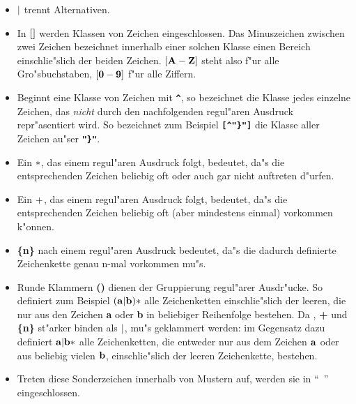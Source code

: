 \begin{itemize}
  
\item ${\bf |}$ trennt Alternativen.
  
\item In  ${\bf []}$ werden Klassen von Zeichen eingeschlossen. Das
Minuszeichen zwischen zwei Zeichen bezeichnet innerhalb einer solchen
Klasse einen Bereich einschlie"slich der beiden Zeichen. ${\bf [A-Z]}$
steht also f"ur alle Gro"sbuchstaben, ${\bf [0-9]}$ f"ur alle Ziffern.
  
\item Beginnt eine Klasse von Zeichen mit {\bf \verb&^&}, so
bezeichnet die Klasse jedes einzelne Zeichen, das {\it nicht} durch
den nachfolgenden regul"aren Ausdruck repr"asentiert wird. So
bezeichnet zum Beispiel {\bf \verb&[^"}"]&} die Klasse aller Zeichen
au"ser {\bf \verb&"}"&}.
  
\item Ein ${\bf *}$, das einem regul"aren Ausdruck folgt, bedeutet,
da"s die entsprechenden Zeichen beliebig oft oder auch gar nicht
auftreten d"urfen.
  
\item Ein ${\bf +}$, das einem regul"aren Ausdruck folgt, bedeutet,
da"s die entsprechenden Zeichen beliebig oft (aber mindestens einmal)
vorkommen k"onnen.
  
\item {\bf \{n\}} nach einem regul"aren Ausdruck bedeutet, da"s die
dadurch definierte Zeichenkette genau n-mal vorkommen mu"s.
  
\item Runde Klammern {\bf
()} dienen der Gruppierung regul"arer
Ausdr"ucke. So definiert zum Beispiel ${\bf
(a|b)*}$ alle Zeichenketten einschlie"slich der leeren, die nur aus
den Zeichen {\bf a} oder {\bf b} in beliebiger Reihenfolge bestehen.
Da {\bf *}, {\bf +} und {\bf \{n\}} st"arker
binden als ${\bf |}$, mu"s geklammert
werden: im Gegensatz dazu definiert ${\bf a|b*}$ alle Zeichenketten,
die entweder nur aus dem Zeichen ${\bf a}$ oder aus beliebig vielen
${\bf b}$, einschlie"slich der leeren Zeichenkette, bestehen.
  
\item Treten diese Sonderzeichen innerhalb von Mustern auf, werden sie
 in ``~'' eingeschlossen.

\end{itemize}


